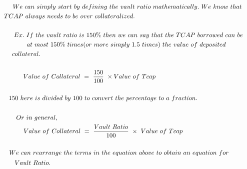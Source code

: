 
{\large \begin{gather}
We\ can\ simply\ start\ by\ defining\ the\ vault\ ratio\ mathematically.\ We\ know\ that\  \notag\\
TCAP\ always\ needs\ to\ be\ over\ collateralized.\ \ \ \ \ \ \ \ \ \ \ \ \ \ \ \ \ \ \ \ \ \ \ \ \ \ \ \ \ \ \ \ \ \ \ \ \ \ \ \ \ \ \ \ \ \ \ \ \ \ \ \ \ \ \ \  \notag\\
 \notag\\
\ Ex.\ If\ the\ vault\ ratio\ is\ 150\%\ then\ we\ can\ say\ that\ the\ TCAP\ borrowed\ can\ be\  \notag\\
at\ most\ 150\%\ times( or\ more\ simply\ 1.5\ times) \ the\ value\ of\ deposited\ \  \notag\\
\ \ \ \ collateral.\ \ \ \ \ \ \ \ \ \ \ \ \ \ \ \ \ \ \ \ \ \ \ \ \ \ \ \ \ \ \ \ \ \ \ \ \ \ \ \ \ \ \ \ \ \ \ \ \ \ \ \ \ \ \ \ \ \ \ \ \ \ \ \ \ \ \ \ \ \ \ \ \ \ \ \ \ \ \ \ \ \ \ \ \ \ \ \ \ \ \ \ \ \ \ \ \ \ \ \ \  \notag\\
 \notag\\
Value\ of\ Collateral\ =\ \frac{150}{100} \ \times Value\ of\ Tcap\ \ \ \ \ \ \ \ \ \ \ \ \ \ \ \ \ \ \ \ \ \ \ \ \ \ \ \ \ \ \ \ \ \ \ \ \  \notag\\
 \notag\\
150\ here\ is\ divided\ by\ 100\ to\ convert\ the\ percentage\ to\ a\ fraction.\ \ \ \ \ \ \ \ \ \ \ \ \ \ \ \ \ \ \ \ \ \ \ \  \notag\\
 \notag\\
\begin{aligned}
Or\ in\ general,\ \ \ \ \ \ \ \ \ \ \ \ \ \ \ \ \ \ \ \ \ \ \ \ \ \ \ \ \ \ \ \ \ \ \ \ \ \ \ \ \ \ \ \ \ \ \ \ \ \ \ \ \ \ \ \ \ \ \ \ \ \ \ \ \ \ \ \ \ \ \ \ \ \ \ \ \ \ \ \ \ \ \ \ \ \ \ 
\end{aligned} \notag\\
Value\ of\ Collateral\ =\ \frac{Vault\ Ratio}{100} \ \times \ Value\ of\ Tcap\ \ \ \ \ \ \ \ \ \ \ \ \ \ \ \ \ \ \ \ \ \ \ \  \notag\\
\ \ \ \  \notag\\
\ \ \ We\ can\ rearrange\ the\ terms\ in\ the\ equation\ above\ to\ obtain\ an\ equation\ for\ \ \ \ \ \ \ \ \ \ \ \  \notag\\
Vault\ Ratio.\ \ \ \ \ \ \ \ \ \ \ \ \ \ \ \ \ \ \ \ \ \ \ \ \ \ \ \ \ \ \ \ \ \ \ \ \ \ \ \ \ \ \ \ \ \ \ \ \ \ \ \ \ \ \ \ \ \ \ \ \ \ \ \ \ \ \ \ \ \ \ \ \ \ \ \ \ \ \ \begin{aligned}
 &  &  &  &  &  &  & 
\end{aligned} \notag\\

\end{gather}}
